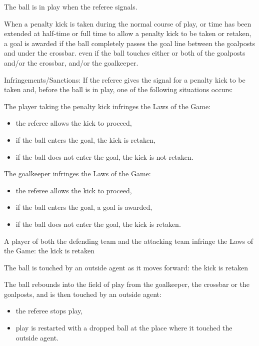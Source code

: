 \documentclass[12pt]{hurocup}
\begin{document}
\begin{lawlist}[US]
\item The ball is in play when the referee signals.
  
\item When a penalty kick is taken during the normal course of play,
  or time has been extended at half-time or full time to allow a
  penalty kick to be taken or retaken, a goal is awarded if the ball
  completely passes the goal line between the goalposts and under the
  crossbar.  even if the ball touches either or both of the goalposts
  and/or the crossbar, and/or the goalkeeper.

\item Infringements/Sanctions: \label{pk-infringements} If the referee
  gives the signal for a penalty kick to be taken and, before the ball
  is in play, one of the following situations occurs:

  The player taking the penalty kick infringes the Laws of the Game:
  \begin{itemize}
  \item the referee allows the kick to proceed,
  \item if the ball enters the goal, the kick is retaken,
  \item if the ball does not enter the goal, the kick is not retaken.
  \end{itemize}

  The goalkeeper infringes the Laws of the Game:
  \begin{itemize}
  \item the referee allows the kick to proceed,
  \item if the ball enters the goal, a goal is awarded,
  \item if the ball does not enter the goal, the kick is retaken.
  \end{itemize}

  A player of both the defending team and the attacking team
  infringe the Laws of the Game: the kick is retaken

  The ball is touched by an outside agent as it moves forward: the
  kick is retaken

  The ball rebounds into the field of play from the goalkeeper,
  the crossbar or the goalposts, and is then touched by an outside agent:
  \begin{itemize}
  \item the referee stops play,
  \item play is restarted with a dropped ball at the place where it
    touched the outside agent. 
  \end{itemize}
\end{lawlist}
\end{document}
